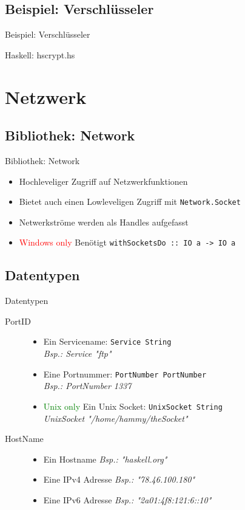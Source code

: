 \documentclass{beamer}
\newcommand{\code}[2]
{
	\begin{block}{#1: #2}
	
	\end{block}
}
\begin{document}
\subsection{Beispiel: Verschl\"usseler}
\begin{frame}{Beispiel: Verschl\"usseler}
\tiny
\code{Haskell}{hscrypt.hs}
\end{frame}

\section{Netzwerk}
\subsection{Bibliothek: Network}
\begin{frame}[<+->]{Bibliothek: Network}
\begin{itemize}
\item Hochleveliger Zugriff auf Netzwerkfunktionen
\item Bietet auch einen Lowleveligen Zugriff mit \texttt{Network.Socket}
\item Netwerkströme werden als Handles aufgefasst
\item \textcolor{red}{Windows only} Benötigt \texttt{withSocketsDo :: IO a -> IO a}
\end{itemize}
\end{frame}

\subsection{Datentypen}
\begin{frame}[<+->]{Datentypen}
\begin{description}
\item[PortID] \begin{itemize}
\item Ein Servicename: \texttt{Service String} \\ \textit{Bsp.: Service "ftp"}
\item Eine Portnummer: \texttt{PortNumber PortNumber} \\ \textit{Bsp.: PortNumber 1337}
\item \textcolor{green}{Unix only} Ein Unix Socket: \texttt{UnixSocket String} \\ \textit{UnixSocket "/home/hammy/theSocket"}
\end{itemize}
\item[HostName]
\begin{itemize}
\item Ein Hostname \textit{Bsp.: "haskell.org"}
\item Eine IPv4 Adresse \textit{Bsp.: "78.46.100.180"}
\item Eine IPv6 Adresse \textit{Bsp.: "2a01:4f8:121:6::10"}
\end{itemize}
\end{description}
\end{frame}
\end{document}
